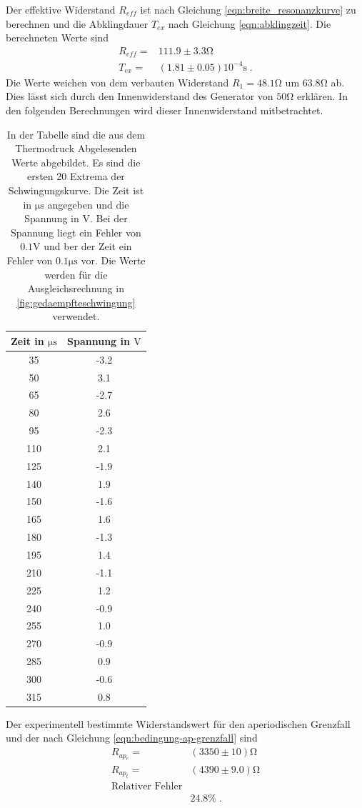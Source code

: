 Der effektive Widerstand $R_{eff}$ ist nach Gleichung \eqref{eqn:breite_resonanzkurve}
 zu berechnen und
die Abklingdauer $T_{ex}$ nach Gleichung \eqref{eqn:abklingzeit}. Die berechneten
Werte sind
\begin{align*}
    R_{eff}=&111.9\pm3.3\si{\ohm}\\
    T_{ex}=&(1.81\pm0.05)10^{-4}\si{\second}\;.
\end{align*}
Die Werte weichen von dem verbauten Widerstand $R_1=48.1\si{\ohm}$ um $63.8\si{\ohm}$
ab. Dies lässt sich durch den Innenwiderstand des Generator von $50\si{\ohm}$ erklären.
In den folgenden Berechnungen wird dieser Innenwiderstand mitbetrachtet.
\begin{table}
  \centering
  \begin{tabular}{c c}
    \toprule
    Zeit in $\si{\micro\second}$ & Spannung in $\si{\volt}$  \\
    \midrule
     35  &  -3.2  \\
     50  &   3.1  \\
     65  &  -2.7  \\
     80  &   2.6  \\
     95  &  -2.3  \\
    110  &   2.1  \\
    125  &  -1.9  \\
    140  &   1.9  \\
    150  &  -1.6  \\
    165  &   1.6  \\
    180  &  -1.3  \\
    195  &   1.4  \\
    210  &  -1.1  \\
    225  &   1.2  \\
    240  &  -0.9  \\
    255  &   1.0  \\
    270  &  -0.9  \\
    285  &   0.9  \\
    300  &  -0.6  \\
    315  &   0.8  \\
    \bottomrule
  \end{tabular}
  \caption{In der Tabelle sind die aus dem Thermodruck Abgelesenden Werte abgebildet.
           Es sind die ersten $20$ Extrema der Schwingungskurve. Die Zeit ist
            in  $\si{\micro\second}$ angegeben und die Spannung in $\si{\volt}$.
            Bei der Spannung liegt ein Fehler von $0.1\si{\volt}$ und ber der Zeit
            ein Fehler von $0.1\si{\micro\second}$ vor. Die Werte werden für die
            Ausgleichsrechnung in \ref{fig:gedaempfteschwingung} verwendet.}
  \label{fig:Messwertegedaempfteschwingung}
\end{table}
Der experimentell bestimmte Widerstandswert für den aperiodischen Grenzfall
und  der nach Gleichung \eqref{eqn:bedingung-ap-grenzfall} sind
\begin{align*}
  R_{ap_e}=&(3350\pm10)\si{\ohm}\\
  R_{ap_t}=&(4390\pm9.0)\si{\ohm}\\
  \text{Relativer Fehler}\\
   &24.8\%\;.
\end{align*}



